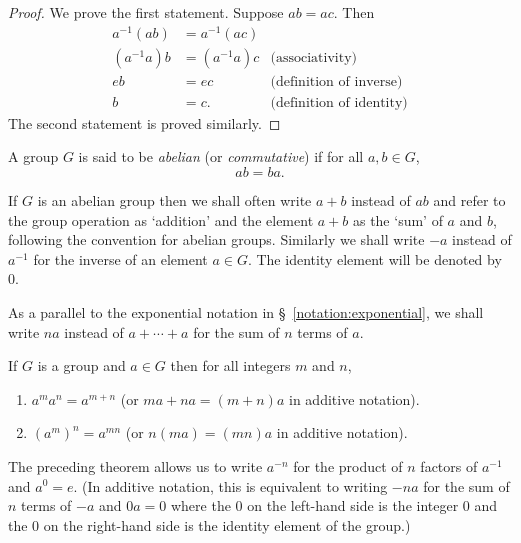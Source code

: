 \begin{proof}
    We prove the first statement. Suppose \(ab = ac\). Then
    \begin{align*}
        a^{-1}(ab) &= a^{-1}(ac) &\\
        (a^{-1}a)b &= (a^{-1}a)c &\text{(associativity)}\\
        eb &= ec &\text{(definition of inverse)}\\
        b &= c. &\text{(definition of identity)}
    \end{align*}
    The second statement is proved similarly.
\end{proof}

\begin{definition}
    A group \(G\) is said to be \emph{abelian} (or \emph{commutative}) if for all \(a, b \in G\),
    \[
        ab = ba.
    \]
\end{definition}

\begin{notation}
    If \(G\) is an abelian group then we shall often write \(a + b\) instead of \(ab\) and refer to the group operation as `addition' and the element \(a + b\) as the `sum' of \(a\) and \(b\), following the convention for abelian groups. Similarly we shall write \(-a\) instead of \(a^{-1}\) for the inverse of an element \(a \in G\). The identity element will be denoted by \(0\).

    As a parallel to the exponential notation in \S~\ref{notation:exponential}, we shall write \(na\) instead of \(a + \cdots + a\) for the sum of \(n\) terms of \(a\).
\end{notation}

\begin{theorem}
    If \(G\) is a group and \(a \in G\) then for all integers \(m\) and \(n\),
    \begin{enumerate}[label=(\alph*)]
        \item \(a^m a^n = a^{m + n}\) (or \(ma + na = (m + n)a\) in additive notation).
        \item \((a^m)^n = a^{mn}\) (or \(n(ma) = (mn)a\) in additive notation).
    \end{enumerate}
\end{theorem}

\begin{remark}
    The preceding theorem allows us to write \(a^{-n}\) for the product of \(n\) factors of \(a^{-1}\) and \(a^0 = e\). (In additive notation, this is equivalent to writing \(-na\) for the sum of \(n\) terms of \(-a\) and \(0a = 0\) where the \(0\) on the left-hand side is the integer \(0\) and the \(0\) on the right-hand side is the identity element of the group.)
\end{remark}

